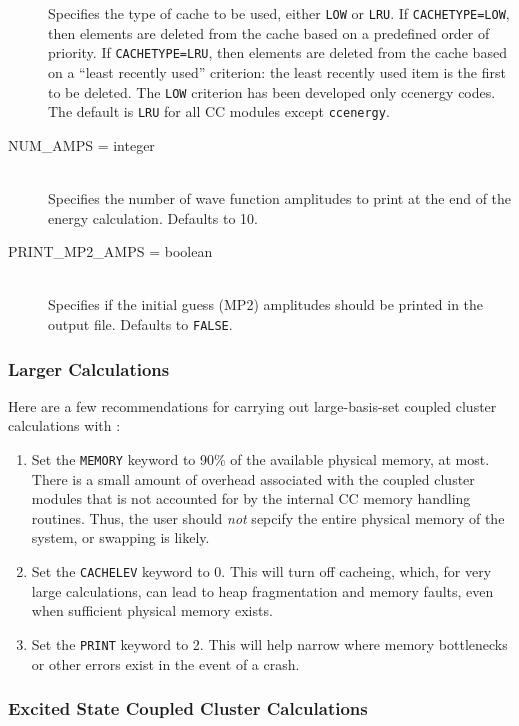 \begin{description}
Specifies the type of cache to be used, either {\tt LOW} or {\tt LRU}.  If
{\tt CACHETYPE=LOW}, then elements are deleted from the cache based on a
predefined order of priority.  If {\tt CACHETYPE=LRU}, then elements are
deleted from the cache based on a ``least recently used'' criterion: the
least recently used item is the first to be deleted.  The {\tt LOW}
criterion has been developed only ccenergy codes.  The default is {\tt LRU}
for all CC modules except {\tt ccenergy}.
\item[NUM\_AMPS = integer]\mbox{}\\
Specifies the number of wave function amplitudes to print at the end of the
energy calculation.  Defaults to 10.
\item[PRINT\_MP2\_AMPS = boolean]\mbox{}\\
Specifies if the initial guess (MP2) amplitudes should be printed in the
output file.  Defaults to {\tt FALSE}.
\end{description}

\subsubsection{Larger Calculations}

Here are a few recommendations for carrying out large-basis-set coupled cluster calculations with \PSIthree: 
\begin{enumerate}
\item Set the {\tt MEMORY} keyword to 90\% of the available physical
memory, at most.  There is a small amount of overhead associated with the
coupled cluster modules that is not accounted for by the internal CC memory
handling routines.  Thus, the user should {\em not} sepcify the entire
physical memory of the system, or swapping is likely.
\item Set the {\tt CACHELEV} keyword to 0.  This will turn off cacheing,
which, for very large calculations, can lead to heap fragmentation and
memory faults, even when sufficient physical memory exists.
\item Set the {\tt PRINT} keyword to 2.  This will help narrow where
memory bottlenecks or other errors exist in the event of a crash.
\end{enumerate}

\subsubsection{Excited State Coupled Cluster Calculations}

